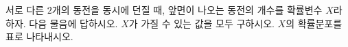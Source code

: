 서로 다른 $2$개의 동전을 동시에 던질 때, 앞면이 나오는 동전의 개수를 확률변수 $X$라 하자. 다음 물음에 답하시오.
 $X$가 가질 수 있는 값을 모두 구하시오.
 $X$의 확률분포를 표로 나타내시오.
